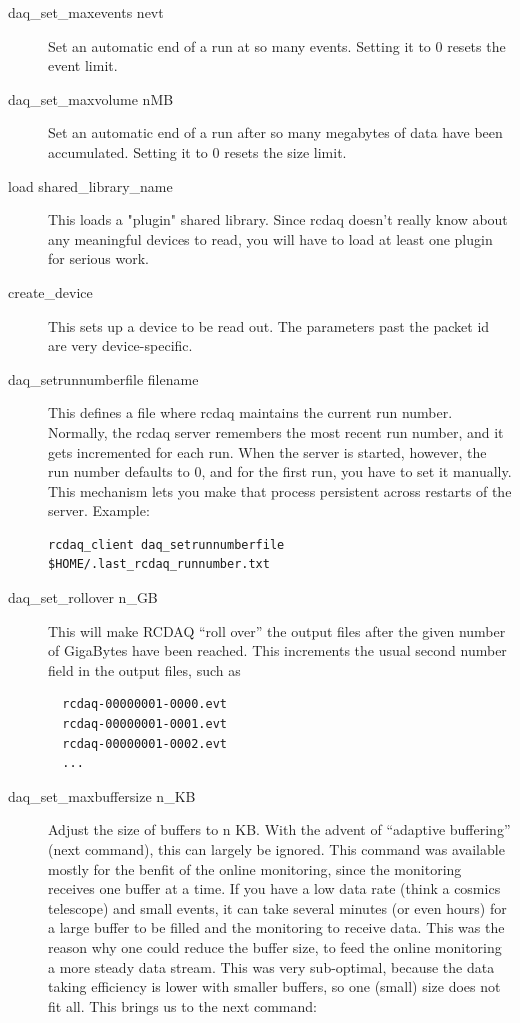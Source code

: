 \documentclass{article}[11pt]
\begin{document}
\begin{description}
\item[daq\_set\_maxevents nevt] Set an automatic end of a run at
  so many events. Setting it to 0 resets the event limit.

\item[daq\_set\_maxvolume nMB] Set an automatic end of a run
  after so many megabytes of data have been accumulated. Setting it to
  0 resets the size limit.

\item[load shared\_library\_name] This loads a "plugin" shared
  library. Since rcdaq doesn't really know about any meaningful
  devices to read, you will have to load at least one plugin for
  serious work.

\item[create\_device]
  This sets up a device to be read out. The parameters past the packet
  id are very device-specific. 

\item[daq\_setrunnumberfile filename] This defines a file where
  rcdaq maintains the current run number. Normally, the rcdaq server
  remembers the most recent run number, and it gets incremented for each run.
  When the server is started, however, the run number defaults to 0, and for the
  first run, you have to set it manually. This mechanism lets you make that 
  process persistent across restarts of the server. Example:

\begin{verbatim}
rcdaq_client daq_setrunnumberfile $HOME/.last_rcdaq_runnumber.txt
\end{verbatim}

\item[daq\_set\_rollover n\_GB] This will make RCDAQ ``roll over'' the
  output files after the given number of GigaBytes have been reached.
  This increments the usual second number field in the output files, such as
\begin{verbatim}
  rcdaq-00000001-0000.evt
  rcdaq-00000001-0001.evt
  rcdaq-00000001-0002.evt
  ...
\end{verbatim}

\item[daq\_set\_maxbuffersize n\_KB] Adjust the size of buffers to n
  KB. With the advent of ``adaptive buffering'' (next command), this
  can largely be ignored. This command was available mostly for the
  benfit of the online monitoring, since the monitoring receives one
  buffer at a time. If you have a low data rate (think a cosmics
  telescope) and small events, it can take several minutes (or even
  hours) for a large buffer to be filled and the monitoring to receive
  data. This was the reason why one could reduce the buffer size, to
  feed the online monitoring a more steady data stream. This was very
  sub-optimal, because the data taking efficiency is lower with
  smaller buffers, so one (small) size does not fit all. This brings
  us to the next command:


\end{description}
\end{document}
